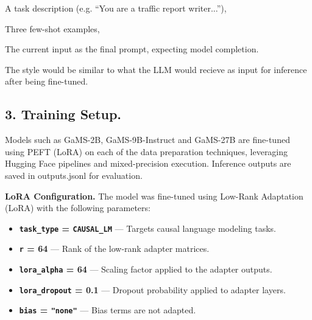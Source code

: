 \documentclass[fleqn,moreauthors,10pt]{ds_report}
\begin{document}
A task description (e.g. “You are a traffic report writer...”),

Three few-shot examples,

The current input as the final prompt, expecting model completion.

The style would be similar to what the LLM would recieve as input for inference after being fine-tuned.

\subsection*{3. Training Setup.}
Models such as GaMS-2B, GaMS-9B-Instruct and GaMS-27B are fine-tuned using PEFT (LoRA) on each of the data preparation techniques, leveraging Hugging Face pipelines and mixed-precision execution. Inference outputs are saved in outputs.jsonl for evaluation. 

\textbf{LoRA Configuration.} The model was fine-tuned using Low-Rank Adaptation (LoRA) with the following parameters:

\begin{itemize}
  \item \textbf{\texttt{task\_type} = \texttt{CAUSAL\_LM}} — Targets causal language modeling tasks.
  \item \textbf{\texttt{r} = 64} — Rank of the low-rank adapter matrices.
  \item \textbf{\texttt{lora\_alpha} = 64} — Scaling factor applied to the adapter outputs.
  \item \textbf{\texttt{lora\_dropout} = 0.1} — Dropout probability applied to adapter layers.
  \item \textbf{\texttt{bias} = \texttt{"none"}} — Bias terms are not adapted.
\end{itemize}








\end{document}
